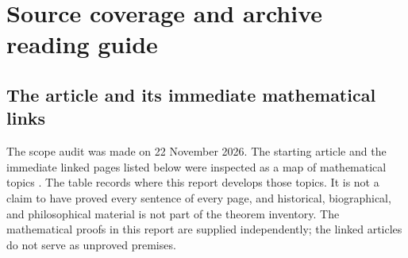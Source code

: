 \section{Source coverage and archive reading guide}
\label{sec:source-map}

\subsection{The article and its immediate mathematical links}

The scope audit was made on 22 November 2026. The starting article and the
immediate linked pages listed below were inspected as a map of mathematical
topics \cite{sourcewiki}. The table records where this report develops those
topics. It is not a claim to have proved every sentence of every page, and
historical, biographical, and philosophical material is not part of the
theorem inventory. The mathematical proofs in this report are supplied
independently; the linked articles do not serve as unproved premises.

